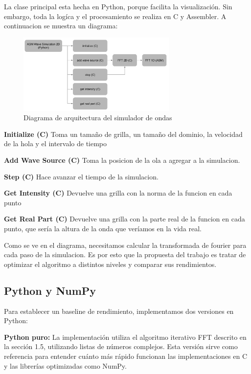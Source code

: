 \documentclass[a4paper]{article}
\begin{document}
La clase principal esta hecha en Python, porque facilita la visualización. Sin embargo, toda la logíca y el procesamiento se realiza
en C y Assembler. A continuacion se muestra un diagrama:
\begin{figure}[h]
    \centering
    \includegraphics[width=0.7\textwidth]{extra/diagram.png}
    \caption{Diagrama de arquitectura del simulador de ondas}
    \label{fig:wave_sim_architecture}
\end{figure}

\textbf{Initialize (C)}
Toma un tamaño de grilla, un tamaño del dominio, la velocidad de la hola y el intervalo de tiempo

\textbf{Add Wave Source (C)}
Toma la posicion de la ola a agregar a la simulacion.

\textbf{Step (C)}
Hace avanzar el tiempo de la simulacion.

\textbf{Get Intensity (C)}
Devuelve una grilla con la norma de la funcion en cada punto

\textbf{Get Real Part (C)}
Devuelve una grilla con la parte real de la funcion en cada punto, que sería la altura de la onda que veríamos en la vida real.

Como se ve en el diagrama, necesitamos calcular la transformada de fourier para cada paso de la simulacion. Es por esto que la
propuesta del trabajo es tratar de optimizar el algoritmo a distintos niveles y comparar sus rendimientos.

\subsection{Python y NumPy}

Para establecer un baseline de rendimiento, implementamos dos versiones en Python:

\textbf{Python puro:} La implementación utiliza el algoritmo iterativo FFT descrito en la sección 1.5, utilizando listas de números complejos. Esta versión sirve como referencia para entender cuánto más rápido funcionan las implementaciones en C y las librerías optimizadas como NumPy.
\end{document}
